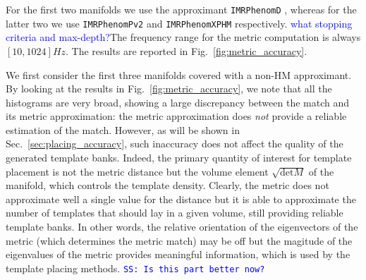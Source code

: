 \documentclass[twocolumn,showpacs,preprintnumbers,nofootinbib,prd,
superscriptaddress,10pt]{revtex4-2}
\newcommand{\stefano}[1]{{\textcolor{blue}{\texttt{SS: #1}} }}
\begin{document}
For the first two manifolds we use the approximant \texttt{IMRPhenomD} \cite{PhysRevD.93.044006, PhysRevD.93.044007}, whereas for the latter two we use \texttt{IMRPhenomPv2} \cite{PhysRevLett.113.151101} and \texttt{IMRPhenomXPHM} \cite{PhysRevD.103.104056} respectively. \textcolor{blue}{what stopping criteria and max-depth?}The frequency range for the metric computation is always $[10, 1024]Hz$.
The results are reported in Fig.~\ref{fig:metric_accuracy}.

We first consider the first three manifolds covered with a non-HM approximant.
By looking at the results in Fig.~\ref{fig:metric_accuracy}, we note that all the histograms are very broad, showing a large discrepancy between the match and its metric approximation: the metric approximation does {\it not} provide a reliable estimation of the match. 
However, as will be shown in Sec.~\ref{sec:placing_accuracy}, such inaccuracy does not affect the quality of the generated template banks. Indeed, the primary quantity of interest for template placement is not the metric distance but the volume element $\sqrt{\text{det}M}$ of the manifold, which controls the template density. Clearly, the metric does not approximate well a single value for the distance but it is able to approximate the number of templates that should lay in a given volume, still providing reliable template banks.
In other words, the relative orientation of the eigenvectors of the metric (which determines the metric match) may be off but the magitude of the eigenvalues of the metric provides meaningful information, which is used by the template placing methods.
\stefano{Is this part better now?}
%
%
\end{document}
